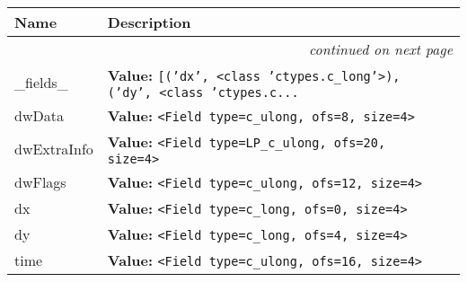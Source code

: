     \vspace{-1cm}
\hspace{\varindent}\begin{longtable}{|p{\varnamewidth}|p{\vardescrwidth}|l}
\cline{1-2}
\cline{1-2} \centering \textbf{Name} & \centering \textbf{Description}& \\
\cline{1-2}
\endhead\cline{1-2}\multicolumn{3}{r}{\small\textit{continued on next page}}\\\endfoot\cline{1-2}
\endlastfoot\raggedright \_\-f\-i\-e\-l\-d\-s\-\_\- & \raggedright \textbf{Value:} 
{\tt \texttt{[}\texttt{(}\texttt{'}\texttt{dx}\texttt{'}\texttt{, }{\textless}class 'ctypes.c\_long'{\textgreater}\texttt{)}\texttt{, }\texttt{(}\texttt{'}\texttt{dy}\texttt{'}\texttt{, }{\textless}class 'ctypes.c\texttt{...}}&\\
\cline{1-2}
\raggedright d\-w\-D\-a\-t\-a\- & \raggedright \textbf{Value:} 
{\tt {\textless}Field type=c\_ulong, ofs=8, size=4{\textgreater}}&\\
\cline{1-2}
\raggedright d\-w\-E\-x\-t\-r\-a\-I\-n\-f\-o\- & \raggedright \textbf{Value:} 
{\tt {\textless}Field type=LP\_c\_ulong, ofs=20, size=4{\textgreater}}&\\
\cline{1-2}
\raggedright d\-w\-F\-l\-a\-g\-s\- & \raggedright \textbf{Value:} 
{\tt {\textless}Field type=c\_ulong, ofs=12, size=4{\textgreater}}&\\
\cline{1-2}
\raggedright d\-x\- & \raggedright \textbf{Value:} 
{\tt {\textless}Field type=c\_long, ofs=0, size=4{\textgreater}}&\\
\cline{1-2}
\raggedright d\-y\- & \raggedright \textbf{Value:} 
{\tt {\textless}Field type=c\_long, ofs=4, size=4{\textgreater}}&\\
\cline{1-2}
\raggedright t\-i\-m\-e\- & \raggedright \textbf{Value:} 
{\tt {\textless}Field type=c\_ulong, ofs=16, size=4{\textgreater}}&\\
\cline{1-2}
\end{longtable}



